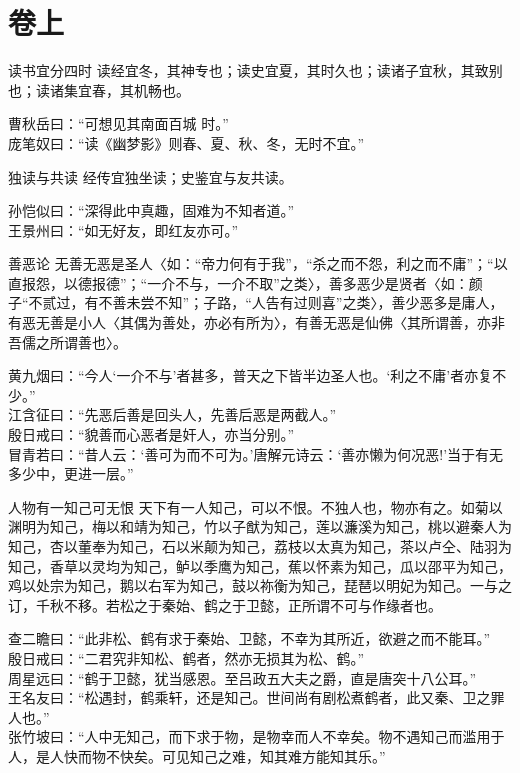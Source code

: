 \chapter{卷上}

\begin{yulu}{读书宜分四时}
读经宜冬，其神专也；读史宜夏，其时久也；读诸子宜秋，其致别也；读诸集宜春，其机畅也。
\begin{comments}
曹秋岳曰：“可想见其南面百城 时。” \\
庞笔奴曰：“读《幽梦影》则春、夏、秋、冬，无时不宜。”
\end{comments}
\end{yulu}

\begin{yulu}{独读与共读}
经传宜独坐读；史鉴宜与友共读。
\begin{comments}
孙恺似曰：“深得此中真趣，固难为不知者道。” \\
王景州曰：“如无好友，即红友亦可。”
\end{comments}
\end{yulu}

\begin{yulu}{善恶论}
无善无恶是圣人〈如：“帝力何有于我”，“杀之而不怨，利之而不庸”；“以直报怨，以德报德”；“一介不与，一介不取”之类〉，善多恶少是贤者〈如：颜子“不贰过，有不善未尝不知”；子路，“人告有过则喜”之类〉，善少恶多是庸人，有恶无善是小人〈其偶为善处，亦必有所为〉，有善无恶是仙佛〈其所谓善，亦非吾儒之所谓善也〉。
\begin{comments}
黄九烟曰：“今人‘一介不与’者甚多，普天之下皆半边圣人也。‘利之不庸’者亦复不少。” \\
江含征曰：“先恶后善是回头人，先善后恶是两截人。” \\
殷日戒曰：“貌善而心恶者是奸人，亦当分别。” \\
冒青若曰：“昔人云：‘善可为而不可为。’唐解元诗云：‘善亦懒为何况恶!’当于有无多少中，更进一层。”
\end{comments}
\end{yulu}

\begin{yulu}{人物有一知己可无恨}
天下有一人知己，可以不恨。不独人也，物亦有之。如菊以渊明为知己，梅以和靖为知己，竹以子猷为知己，莲以濂溪为知己，桃以避秦人为知己，杏以董奉为知己，石以米颠为知己，荔枝以太真为知己，茶以卢仝、陆羽为知己，香草以灵均为知己，鲈以季鹰为知己，蕉以怀素为知己，瓜以邵平为知己，鸡以处宗为知己，鹅以右军为知己，鼓以祢衡为知己，琵琶以明妃为知己。一与之订，千秋不移。若松之于秦始、鹤之于卫懿，正所谓不可与作缘者也。
\begin{comments}
查二瞻曰：“此非松、鹤有求于秦始、卫懿，不幸为其所近，欲避之而不能耳。” \\
殷日戒曰：“二君究非知松、鹤者，然亦无损其为松、鹤。” \\
周星远曰：“鹤于卫懿，犹当感恩。至吕政五大夫之爵，直是唐突十八公耳。” \\
王名友曰：“松遇封，鹤乘轩，还是知己。世间尚有剧松煮鹤者，此又秦、卫之罪人也。” \\
张竹坡曰：“人中无知己，而下求于物，是物幸而人不幸矣。物不遇知己而滥用于人，是人快而物不快矣。可见知己之难，知其难方能知其乐。”
\end{comments}
\end{yulu}

